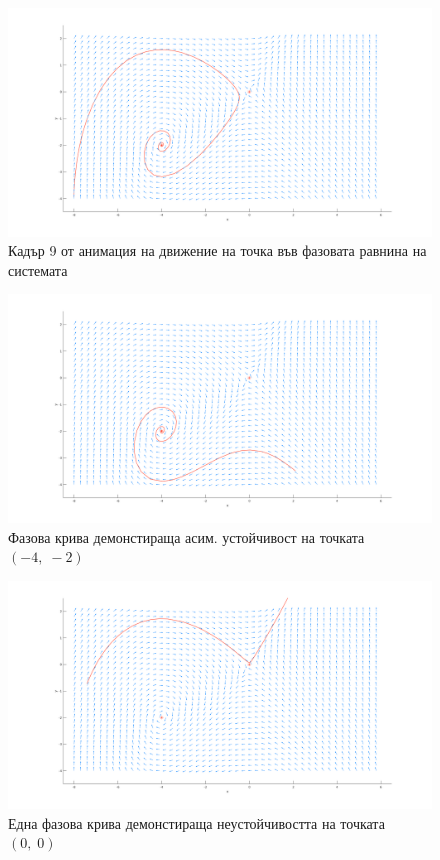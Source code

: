 \documentclass[a4paper, 12pt]{article}
\begin{document}
\begin{figure}[ht]
    \centering
    \includegraphics[width=\textwidth]{move9.png}
    \caption{Кадър 9 от анимация на движение на точка във фазовата равнина на системата}
\end{figure}

\begin{figure}[ht]
    \centering
    \includegraphics[width=\textwidth]{moveA.png}
    \caption{Фазова крива демонстираща асим. устойчивост на точката $(-4, \; -2)$}
\end{figure}

\begin{figure}[ht]
    \centering
    \includegraphics[width=\textwidth]{moveB.png}
    \caption{Една фазова крива демонстираща неустойчивостта на точката $(0, \; 0)$}
\end{figure}
\end{document}
